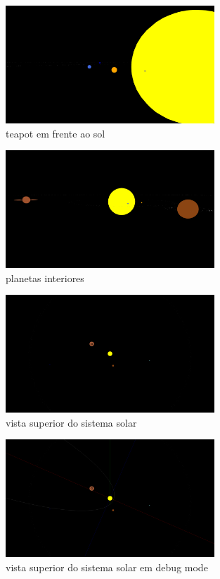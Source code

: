 \documentclass[a4paper]{report}
\begin{document}
\begin{figure}[H]
    \centering 
    \includegraphics[width=0.7\textwidth]{images/close_view.png}  
    \caption{teapot em frente ao sol}
\end{figure}
\begin{figure}[H]
    \centering 
    \includegraphics[width=0.7\textwidth]{images/side_view.png}  
    \caption{planetas interiores}
\end{figure}
\begin{figure}[H]
    \centering 
    \includegraphics[width=0.7\textwidth]{images/top_view.png}  
    \caption{vista superior do sistema solar}
\end{figure}
\begin{figure}[H]
    \centering 
    \includegraphics[width=0.7\textwidth]{images/top_view_debug.png}  
    \caption{vista superior do sistema solar em debug mode}
\end{figure}
\end{document}
